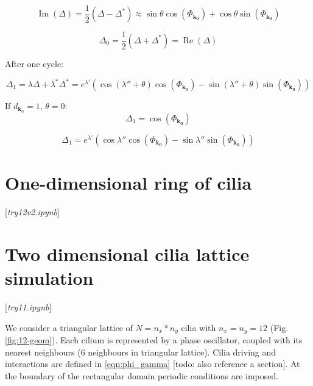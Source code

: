 \documentclass[a4paper,10pt]{article}
\renewcommand*{\Re}{\operatorname{Re}}
\renewcommand*{\Im}{\operatorname{Im}}
\renewcommand*{\vec}[1]{\mathbf{#1}}
\newcommand*{\D}{\Delta}%
\begin{document}
$$
\Im(\D)
= \frac{1}{2} ( \D - \D^*)
\approx  \sin \theta \cos(\Phi_{\mathbf{k_0}}) +  \cos \theta \sin(\Phi_{\mathbf{k_0}})
$$

$$
\D_0 = \frac{1}{2} (\D + \D^*) = \Re(\D)
$$


After one cycle:


$$
\D_1 = \lambda \D + \lambda^* \D^* 
=
e^{\lambda'} 
\left(
\cos(\lambda'' +\theta) \cos(\Phi_{\mathbf{k_0}}) -  \sin( \lambda'' + \theta)   \sin(\Phi_{\mathbf{k_0}})
\right)
$$



If $d_{\vec{k}_0}=1$, $\theta=0$:
$$
\D_1 =  \cos(\Phi_{\mathbf{k_0}})
$$

$$
\D_1 = 
e^{\lambda'} 
\left(
\cos \lambda'' \cos(\Phi_{\mathbf{k_0}}) -  \sin \lambda''   \sin(\Phi_{\mathbf{k_0}})
\right)
$$

\section{One-dimensional ring of cilia}
[\textit{try12v2.ipynb}]

\clearpage
\section{Two dimensional cilia lattice simulation}

[\textit{try11.ipynb}]

We consider a triangular lattice of $N = n_x * n_y$ cilia with $n_x=n_y=12$ (Fig. \ref{fig:12-geom}). Each cilium is represented by a phase oscillator, coupled with its nearest neighbours (6 neighbours in triangular lattice). Cilia driving and interactions are defined in \eqref{eqn:phi_gamma} [todo: also reference a section]. At the boundary of the rectangular domain periodic conditions are imposed.
\end{document}
